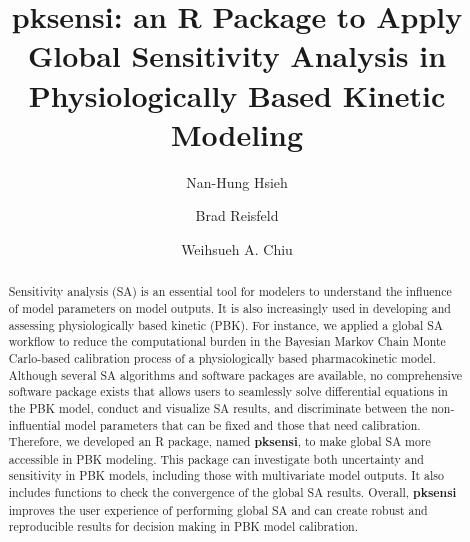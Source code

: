 \documentclass[preprint,12pt, a4paper]{elsarticle}
\begin{document}
\begin{frontmatter}



\title{pksensi: an R Package to Apply Global Sensitivity Analysis in
Physiologically Based Kinetic Modeling}


\author[1]{Nan-Hung Hsieh}
\author[2]{Brad Reisfeld}
\author[1]{Weihsueh A. Chiu}

\address[1]{
Veterinary Integrative Biosciences, College of Veterinary Medicine and
Biomedical Sciences, Texas A\&M University, College Station, TX, USA\\
}
\address[2]{
Chemical and Biological Engineering and School of Biomedical
Engineering, Colorado State University, Fort Collins, CO, USA\\
}


\begin{abstract}
Sensitivity analysis (SA) is an essential tool for modelers to understand the influence of model parameters on model outputs. It is also increasingly used in developing and assessing physiologically based kinetic (PBK). For instance, we applied a global SA workflow to reduce the computational burden in the Bayesian Markov Chain Monte Carlo-based calibration process of a physiologically based pharmacokinetic model. Although several SA algorithms and software packages are available, no comprehensive software package exists that allows users to seamlessly solve differential equations in the PBK model, conduct and visualize SA results, and discriminate between the non-influential model parameters that can be fixed and those that need calibration.  Therefore, we developed an R package, named \textbf{pksensi}, to make global SA more accessible in PBK modeling. This package can investigate both uncertainty and sensitivity in PBK models, including those with multivariate model outputs. It also includes functions to check the convergence of the global SA results. Overall, \textbf{pksensi} improves the user experience of performing global SA and can create robust and reproducible results for decision making in PBK model calibration.


\end{abstract}
\end{frontmatter}
\end{document}
